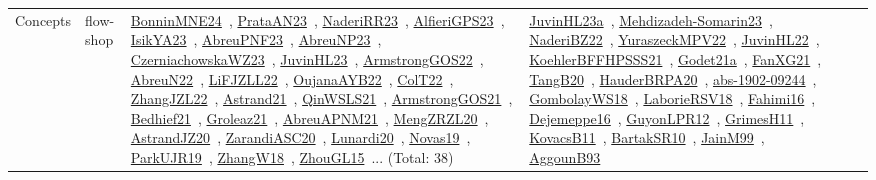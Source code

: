 {\begin{longtable}{lp{3cm}>{\raggedright\arraybackslash}p{6cm}>{\raggedright\arraybackslash}p{6cm}>{\raggedright\arraybackslash}p{8cm}}
Concepts & flow-shop & \href{../works/BonninMNE24.pdf}{BonninMNE24}~\cite{BonninMNE24}, \href{../works/PrataAN23.pdf}{PrataAN23}~\cite{PrataAN23}, \href{../works/NaderiRR23.pdf}{NaderiRR23}~\cite{NaderiRR23}, \href{../works/AlfieriGPS23.pdf}{AlfieriGPS23}~\cite{AlfieriGPS23}, \href{../works/IsikYA23.pdf}{IsikYA23}~\cite{IsikYA23}, \href{../works/AbreuPNF23.pdf}{AbreuPNF23}~\cite{AbreuPNF23}, \href{../works/AbreuNP23.pdf}{AbreuNP23}~\cite{AbreuNP23}, \href{../works/CzerniachowskaWZ23.pdf}{CzerniachowskaWZ23}~\cite{CzerniachowskaWZ23}, \href{../works/JuvinHL23.pdf}{JuvinHL23}~\cite{JuvinHL23}, \href{../works/ArmstrongGOS22.pdf}{ArmstrongGOS22}~\cite{ArmstrongGOS22}, \href{../works/AbreuN22.pdf}{AbreuN22}~\cite{AbreuN22}, \href{../works/LiFJZLL22.pdf}{LiFJZLL22}~\cite{LiFJZLL22}, \href{../works/OujanaAYB22.pdf}{OujanaAYB22}~\cite{OujanaAYB22}, \href{../works/ColT22.pdf}{ColT22}~\cite{ColT22}, \href{../works/ZhangJZL22.pdf}{ZhangJZL22}~\cite{ZhangJZL22}, \href{../works/Astrand21.pdf}{Astrand21}~\cite{Astrand21}, \href{../works/QinWSLS21.pdf}{QinWSLS21}~\cite{QinWSLS21}, \href{../works/ArmstrongGOS21.pdf}{ArmstrongGOS21}~\cite{ArmstrongGOS21}, \href{../works/Bedhief21.pdf}{Bedhief21}~\cite{Bedhief21}, \href{../works/Groleaz21.pdf}{Groleaz21}~\cite{Groleaz21}, \href{../works/AbreuAPNM21.pdf}{AbreuAPNM21}~\cite{AbreuAPNM21}, \href{../works/MengZRZL20.pdf}{MengZRZL20}~\cite{MengZRZL20}, \href{../works/AstrandJZ20.pdf}{AstrandJZ20}~\cite{AstrandJZ20}, \href{../works/ZarandiASC20.pdf}{ZarandiASC20}~\cite{ZarandiASC20}, \href{../works/Lunardi20.pdf}{Lunardi20}~\cite{Lunardi20}, \href{../works/Novas19.pdf}{Novas19}~\cite{Novas19}, \href{../works/ParkUJR19.pdf}{ParkUJR19}~\cite{ParkUJR19}, \href{../works/ZhangW18.pdf}{ZhangW18}~\cite{ZhangW18}, \href{../works/ZhouGL15.pdf}{ZhouGL15}~\cite{ZhouGL15}... (Total: 38) & \href{../works/JuvinHL23a.pdf}{JuvinHL23a}~\cite{JuvinHL23a}, \href{../works/Mehdizadeh-Somarin23.pdf}{Mehdizadeh-Somarin23}~\cite{Mehdizadeh-Somarin23}, \href{../works/NaderiBZ22.pdf}{NaderiBZ22}~\cite{NaderiBZ22}, \href{../works/YuraszeckMPV22.pdf}{YuraszeckMPV22}~\cite{YuraszeckMPV22}, \href{../works/JuvinHL22.pdf}{JuvinHL22}~\cite{JuvinHL22}, \href{../works/KoehlerBFFHPSSS21.pdf}{KoehlerBFFHPSSS21}~\cite{KoehlerBFFHPSSS21}, \href{../works/Godet21a.pdf}{Godet21a}~\cite{Godet21a}, \href{../works/FanXG21.pdf}{FanXG21}~\cite{FanXG21}, \href{../works/TangB20.pdf}{TangB20}~\cite{TangB20}, \href{../works/HauderBRPA20.pdf}{HauderBRPA20}~\cite{HauderBRPA20}, \href{../works/abs-1902-09244.pdf}{abs-1902-09244}~\cite{abs-1902-09244}, \href{../works/GombolayWS18.pdf}{GombolayWS18}~\cite{GombolayWS18}, \href{../works/LaborieRSV18.pdf}{LaborieRSV18}~\cite{LaborieRSV18}, \href{../works/Fahimi16.pdf}{Fahimi16}~\cite{Fahimi16}, \href{../works/Dejemeppe16.pdf}{Dejemeppe16}~\cite{Dejemeppe16}, \href{../works/GuyonLPR12.pdf}{GuyonLPR12}~\cite{GuyonLPR12}, \href{../works/GrimesH11.pdf}{GrimesH11}~\cite{GrimesH11}, \href{../works/KovacsB11.pdf}{KovacsB11}~\cite{KovacsB11}, \href{../works/BartakSR10.pdf}{BartakSR10}~\cite{BartakSR10}, \href{../works/JainM99.pdf}{JainM99}~\cite{JainM99}, \href{../works/AggounB93.pdf}{AggounB93}~\cite{AggounB93} & 
\end{longtable}}

